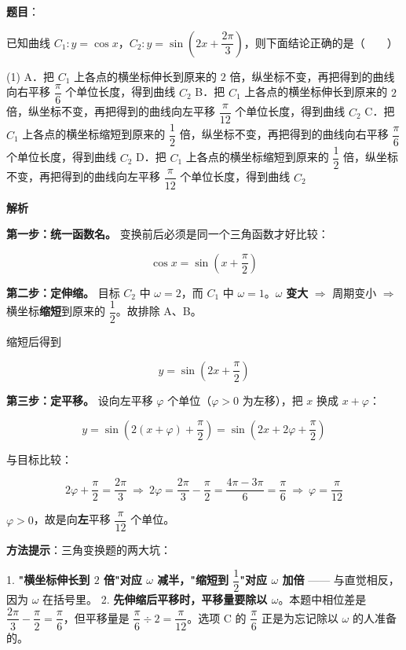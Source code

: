 \begin{answer}

\textbf{题目}：

已知曲线 $C_1:y=\cos x$，$C_2:y=\sin\left(2x+\dfrac{2\pi}3\right)$，则下面结论正确的是\mbox{（　　）}

\begin{gkopts}(1)
\task A．把 $C_1$ 上各点的横坐标伸长到原来的 $2$ 倍，纵坐标不变，再把得到的曲线向右平移 $\dfrac\pi6$ 个单位长度，得到曲线 $C_2$
\task B．把 $C_1$ 上各点的横坐标伸长到原来的 $2$ 倍，纵坐标不变，再把得到的曲线向左平移 $\dfrac\pi{12}$ 个单位长度，得到曲线 $C_2$
\task C．把 $C_1$ 上各点的横坐标缩短到原来的 $\dfrac12$ 倍，纵坐标不变，再把得到的曲线向右平移 $\dfrac\pi6$ 个单位长度，得到曲线 $C_2$
\task D．把 $C_1$ 上各点的横坐标缩短到原来的 $\dfrac12$ 倍，纵坐标不变，再把得到的曲线向左平移 $\dfrac\pi{12}$ 个单位长度，得到曲线 $C_2$
\end{gkopts}

\textbf{解析}

\textbf{第一步：统一函数名。} 变换前后必须是同一个三角函数才好比较：

\nopagebreak[4]
\[\cos x=\sin\left(x+\frac\pi2\right)\]

\textbf{第二步：定伸缩。} 目标 $C_2$ 中 $\omega=2$，而 $C_1$ 中 $\omega=1$。$\omega$ \textbf{变大} $\Rightarrow$ 周期变小 $\Rightarrow$ 横坐标\textbf{缩短}到原来的 $\dfrac12$。故排除 A、B。

缩短后得到

\nopagebreak[4]
\[y=\sin\left(2x+\frac\pi2\right)\]

\textbf{第三步：定平移。} 设向左平移 $\varphi$ 个单位（$\varphi>0$ 为左移），把 $x$ 换成 $x+\varphi$：

\nopagebreak[4]
\[y=\sin\left(2(x+\varphi)+\frac\pi2\right)=\sin\left(2x+2\varphi+\frac\pi2\right)\]

与目标比较：

\nopagebreak[4]
\[2\varphi+\frac\pi2=\frac{2\pi}3\ \Longrightarrow\ 2\varphi=\frac{2\pi}3-\frac\pi2=\frac{4\pi-3\pi}6=\frac\pi6\ \Longrightarrow\ \varphi=\frac\pi{12}\]

$\varphi>0$，故是向\textbf{左}平移 $\dfrac\pi{12}$ 个单位。

\begin{gktip}
\textbf{方法提示}：三角变换题的两大坑：

1. \textbf{"横坐标伸长到 $2$ 倍"对应 $\omega$ 减半，"缩短到 $\dfrac12$"对应 $\omega$ 加倍} —— 与直觉相反，因为 $\omega$ 在括号里。
2. \textbf{先伸缩后平移时，平移量要除以 $\omega$}。本题中相位差是 $\dfrac{2\pi}3-\dfrac\pi2=\dfrac\pi6$，但平移量是 $\dfrac\pi6\div2=\dfrac\pi{12}$。选项 C 的 $\dfrac\pi6$ 正是为忘记除以 $\omega$ 的人准备的。
\end{gktip}


\par\medskip

\end{answer}
